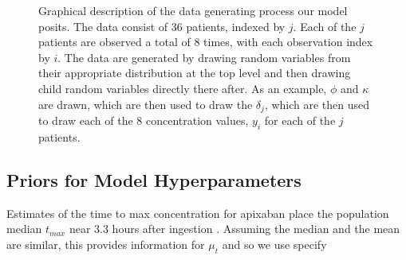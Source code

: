 \begin{figure}[h!]
	\centering
	\label{model_2}
	\caption{Graphical description of the data generating process our model posits.  The data consist of 36 patients, indexed by $j$.  Each of the $j$ patients are observed a total of 8 times, with each observation index by $i$.  The data are generated by drawing random variables from their appropriate distribution at the top level and then drawing child random variables directly there after.  As an example, $\phi$ and $\kappa$ are drawn, which are then used to draw the $\delta_j$, which are then used to draw each of the 8 concentration values, $y_i$ for each of the $j$ patients.}
\end{figure}

\subsection*{Priors for Model Hyperparameters}

Estimates of the time to max concentration for apixaban place the population median $t_{max}$ near 3.3 hours after ingestion \cite{Byon2019-gf}. Assuming the median and the mean are similar, this provides information for $\mu_t$ and so we use specify 

